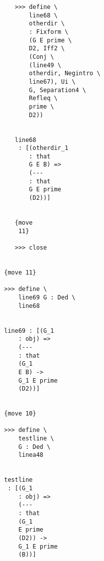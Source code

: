 \documentclass[12pt]{article}
\begin{document}
\begin{verbatim}
                                    >>> define \
                                        line68 \
                                        otherdir \
                                        : Fixform \
                                        (G E prime \
                                        D2, Iff2 \
                                        (Conj \
                                        (line49 \
                                        otherdir, Negintro \
                                        line67), Ui \
                                        G, Separation4 \
                                        Refleq \
                                        prime \
                                        D2))


                                    line68 
                                     : [(otherdir_1 
                                        : that 
                                        G E B) => 
                                        (--- 
                                        : that 
                                        G E prime 
                                        (D2))]


                                    {move 
                                     11}

                                    >>> close


                                 {move 11}

                                 >>> define \
                                     line69 G : Ded \
                                     line68


                                 line69 : [(G_1 
                                     : obj) => 
                                     (--- 
                                     : that 
                                     (G_1 
                                     E B) -> 
                                     G_1 E prime 
                                     (D2))]


                                 {move 10}

                                 >>> define \
                                     testline \
                                     G : Ded \
                                     linea48


                                 testline 
                                  : [(G_1 
                                     : obj) => 
                                     (--- 
                                     : that 
                                     (G_1 
                                     E prime 
                                     (D2)) -> 
                                     G_1 E prime 
                                     (B))]



\end{verbatim}
\end{document}
